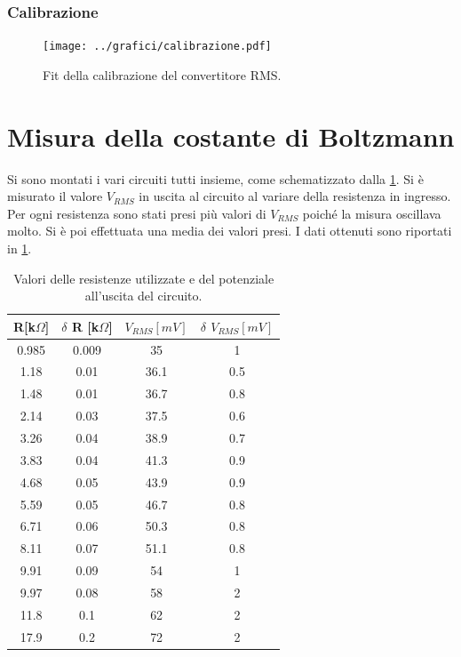 \documentclass[a4paper,10pt]{article}
\begin{document}
\lipsum[4-5]

\subsubsection*{Calibrazione}



\begin{figure}[H]
	\centering
	\texttt{[image: ../grafici/calibrazione.pdf]}
	\vspace*{10pt}
	\caption{Fit della calibrazione del convertitore RMS.}
	\label{fig:blocks}
\end{figure}

\section{Misura della costante di Boltzmann}
Si sono montati i vari circuiti tutti insieme, come schematizzato dalla \cref{fig:blocks}. Si è misurato il valore $V_{RMS}$ in uscita al circuito al variare della resistenza in ingresso. Per ogni resistenza sono stati presi più valori di $V_{RMS}$ poiché la misura oscillava molto. Si è poi effettuata una media dei valori presi. I dati ottenuti sono riportati in \cref{tab:lastfitav}.

\begin{table}[H]
	\centering
	\begin{tabular}{cccc}
		\hline
		R[k$\Omega$] & $\delta$ R [k$\Omega$] & $V_{RMS}[mV]$  & $\delta$ $V_{RMS}[mV]$ \\
		\hline
		0.985 & 0.009 & 35 & 1 \\
		1.18 & 0.01 & 36.1 & 0.5 \\
		1.48 & 0.01 & 36.7 & 0.8 \\
		2.14 & 0.03 & 37.5 & 0.6 \\
		3.26 & 0.04 & 38.9 & 0.7 \\
		3.83 & 0.04 & 41.3 & 0.9 \\
		4.68 & 0.05 & 43.9 & 0.9 \\
		5.59 & 0.05 & 46.7 & 0.8 \\
		6.71 & 0.06 & 50.3 & 0.8 \\
		8.11 & 0.07 & 51.1 & 0.8 \\
		9.91 & 0.09 & 54 & 1 \\
		9.97 & 0.08 & 58 & 2 \\
		11.8 & 0.1 & 62 & 2 \\
		17.9 & 0.2 & 72 & 2 \\
		\hline
	\end{tabular}
	\caption{Valori delle resistenze utilizzate e del potenziale all'uscita del circuito.}
	\label{tab:lastfitav}
\end{table}
\end{document}

